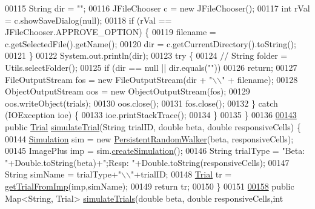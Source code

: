 \begin{DoxyCode}
00115     String dir = \textcolor{stringliteral}{""};
00116     JFileChooser c = \textcolor{keyword}{new} JFileChooser();
00117     \textcolor{keywordtype}{int} rVal = c.showSaveDialog(null);
00118     \textcolor{keywordflow}{if} (rVal == JFileChooser.APPROVE\_OPTION) \{
00119       filename = c.getSelectedFile().getName();
00120       dir = c.getCurrentDirectory().toString();
00121     \}
00122     System.out.println(dir);
00123     \textcolor{keywordflow}{try} \{
00124       \textcolor{comment}{// String folder = Utils.selectFolder();}
00125       \textcolor{keywordflow}{if} (dir == null || dir.equals(\textcolor{stringliteral}{""}))
00126         \textcolor{keywordflow}{return};
00127       FileOutputStream fos = \textcolor{keyword}{new} FileOutputStream(dir + \textcolor{stringliteral}{"\(\backslash\)\(\backslash\)"} + filename);
00128       ObjectOutputStream oos = \textcolor{keyword}{new} ObjectOutputStream(fos);
00129       oos.writeObject(trials);
00130       oos.close();
00131       fos.close();
00132     \} \textcolor{keywordflow}{catch} (IOException ioe) \{
00133       ioe.printStackTrace();
00134     \}
00135   \}
00136   
\hypertarget{_trial_manager_8java_source_l00143}{}\hyperlink{classfunctions_1_1_trial_manager_a394d1db5cf1132ef09b270f9b691ec17}{00143}   \textcolor{keyword}{public} \hyperlink{classdata_1_1_trial}{Trial} \hyperlink{classfunctions_1_1_trial_manager_a394d1db5cf1132ef09b270f9b691ec17}{simulateTrial}(String trialID, \textcolor{keywordtype}{double} beta, \textcolor{keywordtype}{double} responsiveCells) \{
00144     \hyperlink{classdata_1_1_simulation}{Simulation} sim = \textcolor{keyword}{new} \hyperlink{classdata_1_1_persistent_random_walker}{PersistentRandomWalker}(beta, responsiveCells);
00145     ImagePlus imp = sim.\hyperlink{classdata_1_1_simulation_a7fdb72bfe49073e67efb68abd6f58ac4}{createSimulation}();
00146     String trialType = \textcolor{stringliteral}{"Beta: "}+Double.toString(beta)+\textcolor{stringliteral}{";Resp: "}+Double.toString(responsiveCells);
00147     String simName = trialType+\textcolor{stringliteral}{"\(\backslash\)\(\backslash\)"}+trialID;
00148     \hyperlink{classdata_1_1_trial}{Trial} tr = \hyperlink{classfunctions_1_1_trial_manager_a2cc435133a7ef2cd5995f4fdde622611}{getTrialFromImp}(imp,simName);
00149     \textcolor{keywordflow}{return} tr;
00150   \}
00151 
\hypertarget{_trial_manager_8java_source_l00158}{}\hyperlink{classfunctions_1_1_trial_manager_a83f9d10eaa1ef4efb6de1f0e8b690978}{00158}   \textcolor{keyword}{public} Map<String, Trial> \hyperlink{classfunctions_1_1_trial_manager_a83f9d10eaa1ef4efb6de1f0e8b690978}{simulateTrials}(\textcolor{keywordtype}{double} beta, \textcolor{keywordtype}{double} responsiveCells,\textcolor{keywordtype}{int} 

\end{DoxyCode}
